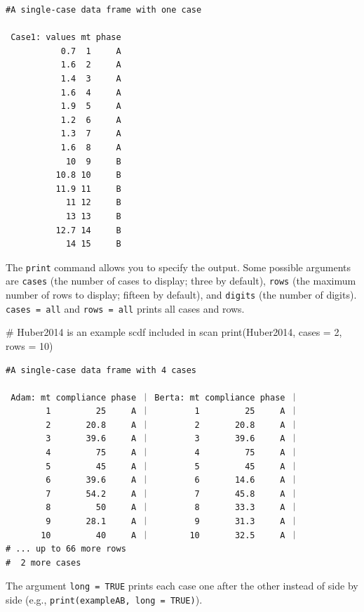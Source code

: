 \documentclass[
  letterpaper,
  DIV=11,
  numbers=noendperiod]{scrreprt}
\newenvironment{Shaded}{\begin{snugshade}}{\end{snugshade}}
\newcommand{\AttributeTok}[1]{\textcolor[rgb]{0.40,0.45,0.13}{#1}}
\newcommand{\CommentTok}[1]{\textcolor[rgb]{0.37,0.37,0.37}{#1}}
\newcommand{\DecValTok}[1]{\textcolor[rgb]{0.68,0.00,0.00}{#1}}
\newcommand{\FunctionTok}[1]{\textcolor[rgb]{0.28,0.35,0.67}{#1}}
\newcommand{\NormalTok}[1]{\textcolor[rgb]{0.00,0.23,0.31}{#1}}
\begin{document}
\begin{verbatim}
#A single-case data frame with one case

 Case1: values mt phase
           0.7  1     A
           1.6  2     A
           1.4  3     A
           1.6  4     A
           1.9  5     A
           1.2  6     A
           1.3  7     A
           1.6  8     A
            10  9     B
          10.8 10     B
          11.9 11     B
            11 12     B
            13 13     B
          12.7 14     B
            14 15     B
\end{verbatim}

The \texttt{print} command allows you to specify the output. Some
possible arguments are \texttt{cases} (the number of cases to display;
three by default), \texttt{rows} (the maximum number of rows to display;
fifteen by default), and \texttt{digits} (the number of digits).
\texttt{cases\ =\ \textquotesingle{}all\textquotesingle{}} and
\texttt{rows\ =\ \textquotesingle{}all\textquotesingle{}} prints all
cases and rows.

\begin{Shaded}
\begin{Highlighting}[]
\CommentTok{\# Huber2014 is an example scdf included in scan}
\FunctionTok{print}\NormalTok{(Huber2014, }\AttributeTok{cases =} \DecValTok{2}\NormalTok{, }\AttributeTok{rows =} \DecValTok{10}\NormalTok{)}
\end{Highlighting}
\end{Shaded}

\begin{verbatim}
#A single-case data frame with 4 cases

 Adam: mt compliance phase ｜ Berta: mt compliance phase ｜
        1         25     A ｜         1         25     A ｜
        2       20.8     A ｜         2       20.8     A ｜
        3       39.6     A ｜         3       39.6     A ｜
        4         75     A ｜         4         75     A ｜
        5         45     A ｜         5         45     A ｜
        6       39.6     A ｜         6       14.6     A ｜
        7       54.2     A ｜         7       45.8     A ｜
        8         50     A ｜         8       33.3     A ｜
        9       28.1     A ｜         9       31.3     A ｜
       10         40     A ｜        10       32.5     A ｜
# ... up to 66 more rows
#  2 more cases
\end{verbatim}

The argument \texttt{long\ =\ TRUE} prints each case one after the other
instead of side by side (e.g.,
\texttt{print(exampleAB,\ long\ =\ TRUE)}).
\end{document}
